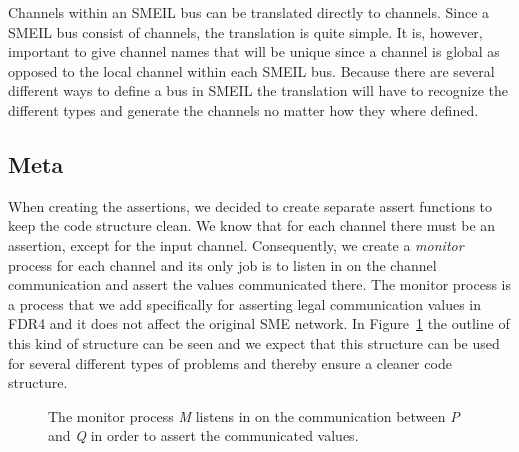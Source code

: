 Channels within an SMEIL bus can be translated directly to \cspm{} channels. Since a SMEIL bus consist of channels, the translation is quite simple. It is, however, important to give channel names that will be unique since a \cspm{} channel is global as opposed to the local channel within each SMEIL bus. Because there are several different ways to define a bus in SMEIL %
the translation will have to recognize the different types and generate the \cspm channels no matter how they where defined.


\subsection{Meta}

When creating the assertions, we decided to create separate assert functions to keep the code structure clean. We know that for each \cspm{} channel there must be an assertion, except for the input channel.
Consequently, we create a \textit{monitor} process for each channel and its only job is to listen in on the channel communication and assert the values communicated there. The monitor process is a process that we add specifically for asserting legal communication values in FDR4 and it does not affect the original SME network.
In Figure~\ref{fig:assertion_process} the outline of this kind of structure can be seen and we expect that this structure can be used for several different types of problems and thereby ensure a cleaner code structure.


\begin{figure}[!ht]
  \centering
  \caption{The monitor process \textit{M} listens in on the communication between \textit{P} and \textit{Q} in order to assert the communicated values.}
  \label{fig:assertion_process}
\end{figure}

